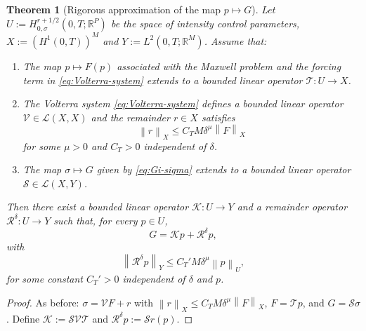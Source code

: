\documentclass[11pt,a4paper]{article}
\numberwithin{equation}{section}
\newtheorem{theorem}{Theorem}[section]
\theoremstyle{definition}
\newcommand{\R}{\mathbb{R}}
\newcommand{\1}{\mathbbm{1}}
\newcommand{\norm}[1]{\left\| #1 \right\|}
\begin{document}
\begin{theorem}[Rigorous approximation of the map $p\mapsto G$]
\label{thm:K-rigorous}
Let $U:=H^{r+1/2}_{0,\sigma}(0,T;\R^P)$ be the space of intensity control
parameters, $X:=(H^1(0,T))^M$ and $Y:=L^2(0,T;\R^M)$. Assume that:
\begin{enumerate}
\item[(i)] The map $p\mapsto F(p)$ associated
with the Maxwell problem and the forcing term in \eqref{eq:Volterra-system} extends to a bounded
linear operator $\mathcal{T}:U\to X$.

\item[(ii)] The Volterra system \eqref{eq:Volterra-system} defines a bounded
linear operator $\mathcal{V}\in\mathcal{L}(X,X)$ and the remainder
$r\in X$ satisfies
\[
\norm{r}_X \le C_T M\delta^\mu\norm{F}_X
\]
for some $\mu>0$ and $C_T>0$ independent of $\delta$.

\item[(iii)] The map $\sigma\mapsto G$ given by \eqref{eq:Gi-sigma} extends
to a bounded linear operator $\mathcal{S}\in\mathcal{L}(X,Y)$.
\end{enumerate}
Then there exist a bounded linear operator $\mathcal{K}:U\to Y$ and a
remainder operator $\mathcal{R}^\delta:U\to Y$ such that, for every
$p\in U$,
\begin{equation}
\label{eq:K-decomposition}
G = \mathcal{K}p + \mathcal{R}^\delta p,
\end{equation}
with
\begin{equation}
\label{eq:Rdelta-bound}
\norm{\mathcal{R}^\delta p}_Y \le C_T' M\delta^\mu\norm{p}_U,
\end{equation}
for some constant $C_T'>0$ independent of $\delta$ and $p$.
\end{theorem}

\begin{proof}
As before: $\sigma = \mathcal{V}F + r$ with
$\norm{r}_X\le C_T M\delta^\mu\norm{F}_X$, $F=\mathcal{T}p$, and
$G=\mathcal{S}\sigma$. Define $\mathcal{K}:=\mathcal{S}\mathcal{V}
\mathcal{T}$ and $\mathcal{R}^\delta p := \mathcal{S}r(p)$.
\end{proof}
\end{document}
